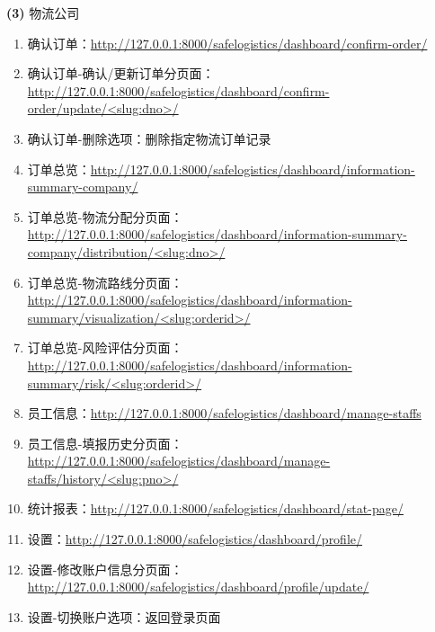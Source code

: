 \documentclass[12pt]{article}
\begin{document}
\noindent \textbf{(3)} 物流公司 \par
\begin{enumerate}
	\item 确认订单：\url{http://127.0.0.1:8000/safelogistics/dashboard/confirm-order/}
	\item 确认订单-确认/更新订单分页面：\url{http://127.0.0.1:8000/safelogistics/dashboard/confirm-order/update/<slug:dno>/}
	\item 确认订单-删除选项：删除指定物流订单记录
	\item 订单总览：\url{http://127.0.0.1:8000/safelogistics/dashboard/information-summary-company/}
	\item 订单总览-物流分配分页面：\url{http://127.0.0.1:8000/safelogistics/dashboard/information-summary-company/distribution/<slug:dno>/}
	\item 订单总览-物流路线分页面：\url{http://127.0.0.1:8000/safelogistics/dashboard/information-summary/visualization/<slug:orderid>/}
	\item 订单总览-风险评估分页面：\url{http://127.0.0.1:8000/safelogistics/dashboard/information-summary/risk/<slug:orderid>/}
	\item 员工信息：\url{http://127.0.0.1:8000/safelogistics/dashboard/manage-staffs}
	\item 员工信息-填报历史分页面：\url{http://127.0.0.1:8000/safelogistics/dashboard/manage-staffs/history/<slug:pno>/}
	\item 统计报表：\url{http://127.0.0.1:8000/safelogistics/dashboard/stat-page/}
	\item 设置：\url{http://127.0.0.1:8000/safelogistics/dashboard/profile/}
	\item 设置-修改账户信息分页面：\url{http://127.0.0.1:8000/safelogistics/dashboard/profile/update/}
	\item 设置-切换账户选项：返回登录页面
\end{enumerate}
\end{document}
